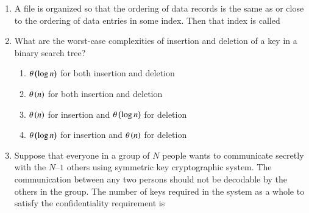 \documentclass[journal,12pt,onecolumn]{IEEEtran}
\theoremstyle{remark}
\begin{document}
\begin{enumerate}
		\hfill{}
		
		\item A file is organized so that the ordering of data records is the same as or close to the ordering of data entries in some index. Then that index is called
		
		\hfill{}
		
		\begin{enumerate}
		\end{enumerate}
		
		\item What are the worst-case complexities of insertion and deletion of a key in a binary search tree?
		
		\hfill{\brak{\text{GATE CS 2015}}}
		
		\begin{enumerate}
			\item $\theta\left(\log n\right)$ for both insertion and deletion
			\item $\theta\left(n\right)$ for both insertion and deletion
			\item $\theta\left(n\right)$ for insertion and $\theta\left(\log n\right)$ for deletion
			\item $\theta\left(\log n\right)$ for insertion and $\theta\left(n\right)$ for deletion
		\end{enumerate}
		
		\item Suppose that everyone in a group of $N$ people wants to communicate secretly with the $N–1$ others using symmetric key cryptographic system. The communication between any two persons should not be decodable by the others in the group. The number of keys required in the system as a whole to satisfy the confidentiality requirement is
		
		\hfill{}
		
		\begin{enumerate}
		\end{enumerate}
		

\end{enumerate}
\end{document}
